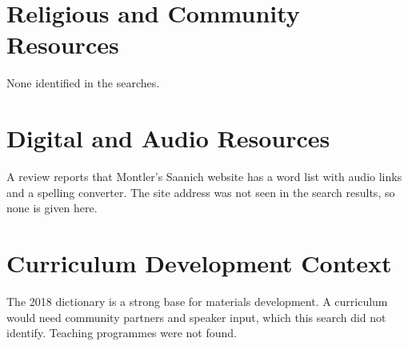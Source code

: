 \documentclass[12pt]{article}
\begin{document}
\section{Religious and Community Resources}
None identified in the searches.

\section{Digital and Audio Resources}
A review reports that Montler's Saanich website has a word list with audio links and a spelling converter. The site address was not seen in the search results, so none is given here.

\section{Curriculum Development Context}
The 2018 dictionary is a strong base for materials development. A curriculum would need community partners and speaker input, which this search did not identify. Teaching programmes were not found.
\end{document}

